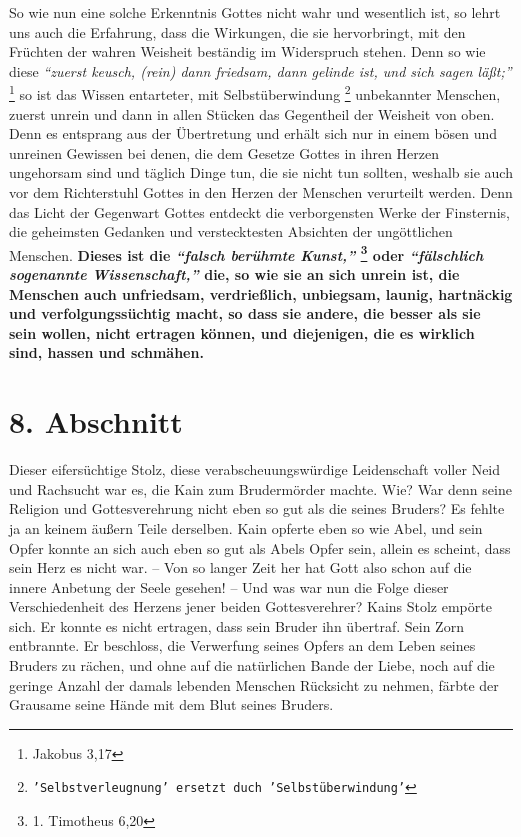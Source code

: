 So wie nun eine solche Erkenntnis Gottes nicht wahr und wesentlich ist, so
lehrt uns auch die Erfahrung, dass die Wirkungen, die sie hervorbringt, mit den
Früchten der wahren Weisheit beständig im Widerspruch stehen. Denn so wie diese
\textit{"`zuerst keusch, (rein) dann friedsam, dann gelinde ist, und sich sagen
läßt;"'}
\footnote{Jakobus 3,17}
so ist das Wissen entarteter, mit Selbstüberwindung
\footnote{\texttt{'Selbstverleugnung' ersetzt duch 'Selbstüberwindung'}}
unbekannter Menschen, zuerst unrein und dann in allen Stücken das Gegentheil
der Weisheit von oben. Denn es entsprang aus der Übertretung und erhält sich
nur in einem bösen und unreinen Gewissen bei denen, die
dem Gesetze Gottes in
ihren Herzen ungehorsam sind und täglich Dinge tun, die sie nicht tun
sollten, weshalb sie auch vor dem Richterstuhl Gottes in den Herzen der
Menschen verurteilt werden. Denn das Licht der Gegenwart Gottes entdeckt die
verborgensten Werke der Finsternis, die geheimsten
Gedanken  und verstecktesten
Absichten der ungöttlichen
Menschen. \textbf{Dieses ist die
\textit{"`falsch berühmte Kunst,"'}
\footnote{1. Timotheus 6,20}
oder  \textit{"`fälschlich sogenannte
Wissenschaft,"'}
die, so wie sie an sich unrein  ist, die
Menschen auch unfriedsam, verdrießlich,
unbiegsam, launig, hartnäckig und verfolgungssüchtig macht, so dass sie andere,
die besser als sie sein wollen, nicht ertragen können, und diejenigen, die es
wirklich sind, hassen und schmähen.}

\section{8. Abschnitt} \label{kap7_ab8}

Dieser eifersüchtige Stolz, diese
verabscheuungswürdige Leidenschaft voller Neid
und Rachsucht war es, die Kain  zum
Brudermörder  machte. Wie? War denn seine
Religion und Gottesverehrung nicht eben so gut als die seines Bruders? Es fehlte
ja an keinem äußern Teile derselben. Kain  opferte eben so wie
Abel, und sein
Opfer konnte an sich auch eben so gut als Abels Opfer sein, allein es scheint,
dass sein Herz es nicht war. -- Von so langer Zeit her hat Gott also schon auf
die innere Anbetung der Seele gesehen! -- Und was war nun die Folge dieser
Verschiedenheit des Herzens jener beiden Gottesverehrer? Kains Stolz empörte
sich. Er konnte es nicht ertragen, dass sein Bruder ihn übertraf. Sein Zorn
entbrannte. Er beschloss, die Verwerfung seines Opfers an dem Leben seines
Bruders zu rächen, und ohne auf die natürlichen Bande der Liebe,
noch auf die
geringe Anzahl der damals lebenden Menschen Rücksicht zu nehmen, färbte der
Grausame seine Hände mit dem Blut seines Bruders.

